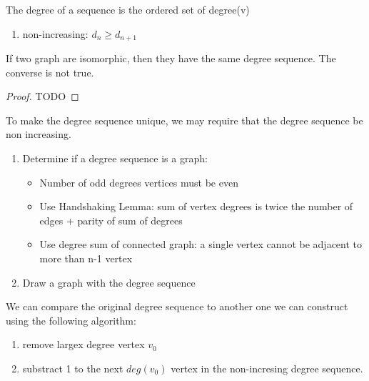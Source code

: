 \documentclass{article}
\begin{document}
\begin{definition}
    The degree of a sequence is the ordered set of degree(v)
    \begin{enumerate}
	\item non-increasing: $ d_n \geq d_{n+1}$
    \end{enumerate}
\end{definition}

\begin{theorem}
    If two graph  are isomorphic, then they have the same degree sequence.
    The converse is not true.
\end{theorem}

\begin{proof}
    TODO
\end{proof}

\begin{remark}
    To make the degree sequence unique, we may require that the degree
    sequence be non increasing.
\end{remark}

\begin{problem}
    \begin{enumerate}
        \item Determine if a degree sequence is a graph:
	    \begin{itemize}
		\item Number of odd degrees vertices must be even
	        \item Use Handshaking Lemma: sum of vertex degrees is twice
		    the number of edges + parity of sum of degrees
		\item Use degree sum of connected graph: a single vertex
		    cannot be adjacent to more than n-1 vertex
	    \end{itemize}
	\item Draw a graph with the degree sequence
    \end{enumerate}
\end{problem}

\begin{remark}
    We can compare the original degree sequence to another one we can
    construct using the following algorithm:
    \begin{enumerate}
        \item remove largex degree vertex $v_0$
	\item substract 1 to the next $deg(v_0)$ vertex in the non-incresing
	    degree sequence.
    \end{enumerate}
\end{remark}
\end{document}
